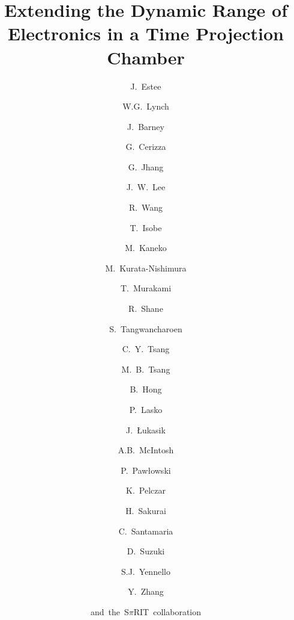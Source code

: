 \documentclass[review]{elsarticle}
\begin{document}
\begin{frontmatter}

\title{Extending the Dynamic Range of Electronics in a Time Projection Chamber}


\author[nscl,msu]{J.~Estee}
\author[nscl,msu]{W.G.~Lynch}
\author[nscl,msu]{J.~Barney}
\author[nscl,msu]{G.~Cerizza}
\author[nscl]{G.~Jhang}
\author[kor]{J.~W.~Lee}
\author[nscl]{R.~Wang}
\author[riken]{T.~Isobe}
\author[kyoto]{M.~Kaneko}
\author[riken]{M.~Kurata-Nishimura}
\author[kyoto]{T.~Murakami}
\author[nscl]{R.~Shane}
\author[nscl]{S.~Tangwancharoen}
\author[nscl]{C.~Y.~Tsang}
\author[nscl]{M.~B.~Tsang}
\author[kor]{B.~Hong}
\author[krakow]{P.~Lasko}
\author[krakow]{J.~\L ukasik}
\author[a&m]{A.B.~McIntosh}
\author[krakow]{P.~Paw\l owski}
\author[poland]{K.~Pelczar}
\author[riken]{H.~Sakurai}
\author[nscl]{C.~Santamaria}
\author[riken]{D.~Suzuki}
\author[a&m2]{S.J.~Yennello}
\author[tsing]{Y.~Zhang}
\author[]{and~the~S$\pi$RIT~collaboration}

\address[nscl]{National Superconducting Cyclotron Laboratory, East Lansing, Michigan, 48824, USA}
\address[msu]{Department of Physics and Astronomy, Michigan State University, East Lansing, Michigan, 48824, USA }
\address[kor]{Department of Physics, Korea University, Seoul 02841, Republic of Korea }
\address[riken]{RIKEN Nishina Center, Hirosawa 2-1, Wako, Saitama 351-0198, Japan }
\address[kyoto]{Department of Physics, Kyoto University, Kita-shirakawa, Kyoto 606-8502, Japan }
\address[krakow]{Institute of Nuclear Physics PAN, ul. Radzikowskiego 152, 31-342 Krak\'{o}w, Poland}
\address[a&m]{Cyclotron Institute, Texas A$\&$M University, College Station, TX 77843, USA }
\address[a&m2]{Chemistry Department, Cyclotron Institute, Texas A$\&$M University, College Station, TX 77843, USA }
\address[tsing]{Department of Physics, Tsinghua University, Beijing 100084, P. R. China}
\address[poland]{Gran Sasso National Laboratory - INFN, Via G. Acitelli 22, 67100 Assergi, L'Aquila AQ, Italy}




\end{frontmatter}
\end{document}
